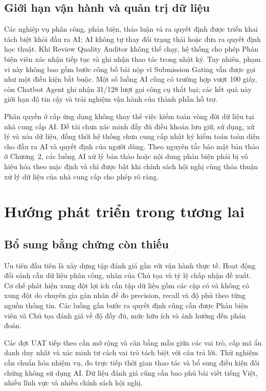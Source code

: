 \subsection{Giới hạn vận hành và quản trị dữ liệu}

Các nghiệp vụ phân công, phản biện, thảo luận và ra quyết định được triển khai tách biệt khỏi đầu ra AI; AI không tự thay đổi trạng thái hoặc đưa ra quyết định học thuật. Khi Review Quality Auditor không thể chạy, hệ thống cho phép Phản biện viên xác nhận tiếp tục và ghi nhận thao tác trong nhật ký. Tuy nhiên, phạm vi này không bao gồm bước công bố bài nộp vì Submission Gating vẫn được gọi như một điều kiện bắt buộc. Một số luồng AI cũng có trường hợp vượt 100 giây, còn Chatbot Agent ghi nhận 31/128 lượt gọi công cụ thất bại; các kết quả này giới hạn độ tin cậy và trải nghiệm vận hành của thành phần hỗ trợ.

Phân quyền ở cấp ứng dụng không thay thế việc kiểm toán vòng đời dữ liệu tại nhà cung cấp AI. Đề tài chưa xác minh đầy đủ điều khoản lưu giữ, sử dụng, xử lý và xóa dữ liệu, đồng thời hệ thống chưa cung cấp nhật ký kiểm toán toàn diện cho đầu ra AI và quyết định của người dùng. Theo nguyên tắc bảo mật bản thảo ở Chương~2, các luồng AI xử lý bản thảo hoặc nội dung phản biện phải bị vô hiệu hóa theo mặc định và chỉ được bật khi chính sách hội nghị cùng thỏa thuận xử lý dữ liệu của nhà cung cấp cho phép rõ ràng.

\section{Hướng phát triển trong tương lai}

\subsection{Bổ sung bằng chứng còn thiếu}

Ưu tiên đầu tiên là xây dựng tập đánh giá gần với vận hành thực tế. Hoạt động đối sánh cần dữ liệu phân công, nhãn của Chủ tọa và tỷ lệ chấp nhận đề xuất. Cơ chế phát hiện xung đột lợi ích cần tập dữ liệu gồm các cặp có và không có xung đột do chuyên gia gán nhãn để đo precision, recall và độ phủ theo từng nguồn thông tin. Các luồng gần bước ra quyết định cũng cần được Phản biện viên và Chủ tọa đánh giá về độ đầy đủ, mức hữu ích và ảnh hưởng đến phán đoán.

Các đợt UAT tiếp theo cần mở rộng và cân bằng mẫu giữa các vai trò, cấp mã ẩn danh duy nhất và xác minh tư cách vai trò tách biệt với câu trả lời. Thử nghiệm cần chuẩn hóa nhiệm vụ, đo trực tiếp thời gian thao tác và bổ sung điều kiện đối chứng không sử dụng AI. Dữ liệu đánh giá cũng cần bao phủ bài viết tiếng Việt, nhiều lĩnh vực và nhiều chính sách hội nghị.

